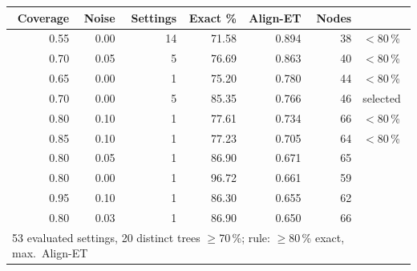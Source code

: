 \begin{tabular}{rrrrrrl}
\hline
Coverage & Noise & Settings & Exact \% & Align-ET & Nodes & \\
\hline
0.55 & 0.00 & 14 & 71.58 & 0.894 & 38 & $<$80\,\% \\
0.70 & 0.05 & 5 & 76.69 & 0.863 & 40 & $<$80\,\% \\
0.65 & 0.00 & 1 & 75.20 & 0.780 & 44 & $<$80\,\% \\
0.70 & 0.00 & 5 & 85.35 & 0.766 & 46 & selected \\
0.80 & 0.10 & 1 & 77.61 & 0.734 & 66 & $<$80\,\% \\
0.85 & 0.10 & 1 & 77.23 & 0.705 & 64 & $<$80\,\% \\
0.80 & 0.05 & 1 & 86.90 & 0.671 & 65 &  \\
0.80 & 0.00 & 1 & 96.72 & 0.661 & 59 &  \\
0.95 & 0.10 & 1 & 86.30 & 0.655 & 62 &  \\
0.80 & 0.03 & 1 & 86.90 & 0.650 & 66 &  \\
\hline
\multicolumn{7}{l}{53 evaluated settings, 20 distinct trees $\geq$70\,\%; rule: $\geq$80\,\% exact, max.\ Align-ET} \\
\hline
\end{tabular}
